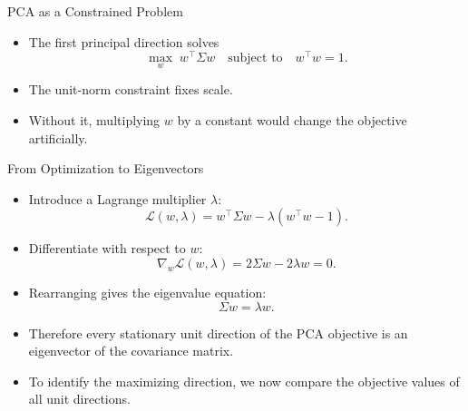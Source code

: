 \begin{frame}{PCA as a Constrained Problem}
\begin{itemize}
  \item The first principal direction solves
  \begin{equation}
    \max_{w} \; w^\top \Sigma w
    \quad \text{subject to} \quad
    w^\top w = 1.
    \label{eq:pca-constrained}
  \end{equation}
  \pause
  \item The unit-norm constraint fixes scale.
  \pause
  \item Without it, multiplying $w$ by a constant would change the objective artificially.
\end{itemize}
\end{frame}

\begin{frame}{From Optimization to Eigenvectors}
\begin{itemize}
  \item Introduce a Lagrange multiplier $\lambda$:
  \begin{equation}
    \mathcal{L}(w,\lambda)=w^\top \Sigma w-\lambda (w^\top w-1).
    \label{eq:lagrangian}
  \end{equation}
  \pause
  \item Differentiate with respect to $w$:
  \begin{equation}
    \nabla_w \mathcal{L}(w,\lambda)=2\Sigma w-2\lambda w = 0.
    \label{eq:lagrange-grad}
  \end{equation}
  \pause
  \item Rearranging gives the eigenvalue equation:
  \begin{equation}
    \Sigma w = \lambda w.
    \label{eq:eigenproblem-pca}
  \end{equation}
  \item Therefore every stationary unit direction of the PCA objective is an eigenvector of the covariance matrix.
  \pause
  \item To identify the maximizing direction, we now compare the objective values of all unit directions.
\end{itemize}
\end{frame}

